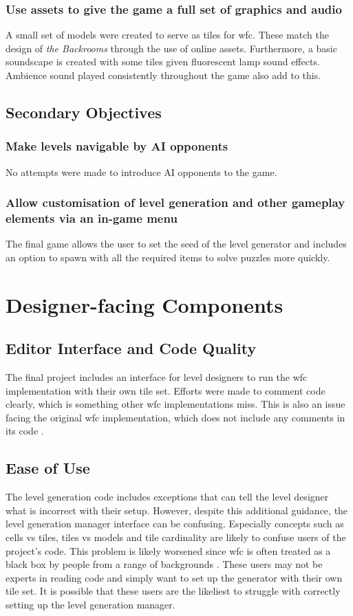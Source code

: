 \subsubsection{Use assets to give the game a full set of graphics and audio}
A small set of models were created to serve as tiles for \acrshort{wfc}. These match the design of \textit{the Backrooms} through the use of online assets. Furthermore, a basic soundscape is created with some tiles given fluorescent lamp sound effects. Ambience sound played consistently throughout the game also add to this.%

\subsection{Secondary Objectives}
\subsubsection{Make levels navigable by AI opponents}
No attempts were made to introduce AI opponents to the game.

\subsubsection{Allow customisation of level generation and other gameplay elements via an in-game menu}
The final game allows the user to set the seed of the level generator and includes an option to spawn with all the required items to solve puzzles more quickly.

\section{Designer-facing Components}
\subsection{Editor Interface and Code Quality}
The final project includes an interface for level designers to run the \acrshort{wfc} implementation with their own tile set. Efforts were made to comment code clearly, which is something other \acrshort{wfc} implementations miss. This is also an issue facing the original \acrshort{wfc} implementation, which does not include any comments in its code \cite{Gumin_Wave_Function_Collapse_2016}.

\subsection{Ease of Use}
The level generation code includes exceptions that can tell the level designer what is incorrect with their setup. However, despite this additional guidance, the level generation manager interface can be confusing. Especially concepts such as cells vs tiles, tiles vs models and tile cardinality are likely to confuse users of the project's code. This problem is likely worsened since \acrshort{wfc} is often treated as a black box by people from a range of backgrounds \cite{WFC_In_The_Wild}. These users may not be experts in reading code and simply want to set up the generator with their own tile set. It is possible that these users are the likeliest to struggle with correctly setting up the level generation manager.

